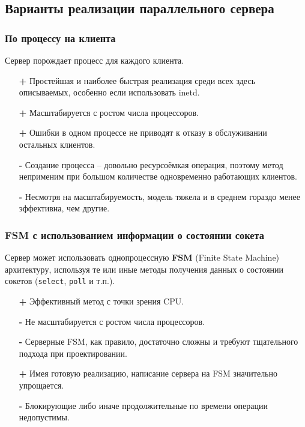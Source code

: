 \subsection{Варианты реализации параллельного сервера}

\subsubsection{По процессу на клиента}
Сервер порождает процесс для каждого клиента.
\begin{itemize}
  \item[\textbf{+}] Простейшая и наиболее быстрая реализация среди всех здесь описываемых, особенно если использовать inetd.
  \item[\textbf{+}] Масштабируется с ростом числа процессоров.
  \item[\textbf{+}] Ошибки в одном процессе не приводят к отказу в обслуживании остальных клиентов.
  \item[\textbf{-}] Создание процесса -- довольно ресурсоёмкая операция, поэтому метод неприменим при большом количестве одновременно работающих клиентов.
  \item[\textbf{-}] Несмотря на масштабируемость, модель тяжела и в среднем гораздо менее эффективна, чем другие.
\end{itemize}

\subsubsection{FSM с использованием информации о состоянии сокета}
Сервер может использовать однопроцессную \textbf{FSM} (Finite State Machine) архитектуру, используя те или иные методы получения данных о состоянии сокетов (\lstinline{select}, \lstinline{poll} и т.п.).
\begin{itemize}
  \item[\textbf{+}] Эффективный метод с точки зрения CPU.
  \item[\textbf{-}] Не масштабируется с ростом числа процессоров.
  \item[\textbf{-}] Серверные FSM, как правило, достаточно сложны и требуют тщательного подхода при проектировании.
  \item[\textbf{+}] Имея готовую реализацию, написание сервера на FSM значительно упрощается.
  \item[\textbf{-}] Блокирующие либо иначе продолжительные по времени операции недопустимы.
\end{itemize}

